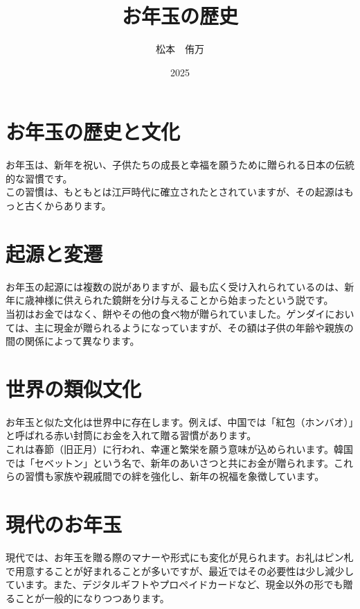 \documentclass[a4paper]{article}
\begin{document}
    \title{お年玉の歴史}
    \author{松本　侑万}
    \date{2025}
    \maketitle

    \section{お年玉の歴史と文化}
    お年玉は、新年を祝い、子供たちの成長と幸福を願うために贈られる日本の伝統的な習慣です。\\
    この習慣は、もともとは江戸時代に確立されたとされていますが、その起源はもっと古くからあります。\\

    \section{起源と変遷}
    お年玉の起源には複数の説がありますが、最も広く受け入れられているのは、新年に歳神様に供えられた鏡餅を分け与えることから始まったという説です。\\
    当初はお金ではなく、餅やその他の食べ物が贈られていました。ゲンダイにおいては、主に現金が贈られるようになっていますが、その額は子供の年齢や親族の間の関係によって異なります。\\

    \section{世界の類似文化}
    お年玉と似た文化は世界中に存在します。例えば、中国では「紅包（ホンバオ）」と呼ばれる赤い封筒にお金を入れて贈る習慣があります。\\
    これは春節（旧正月）に行われ、幸運と繁栄を願う意味が込められいます。韓国では「セベットン」という名で、新年のあいさつと共にお金が贈られます。これらの習慣も家族や親戚間での絆を強化し、新年の祝福を象徴しています。\\

    \section{現代のお年玉}
    現代では、お年玉を贈る際のマナーや形式にも変化が見られます。お礼はピン札で用意することが好まれることが多いですが、最近ではその必要性は少し減少しています。また、デジタルギフトやプロペイドカードなど、現金以外の形でも贈ることが一般的になりつつあります。\\
\end{document}
